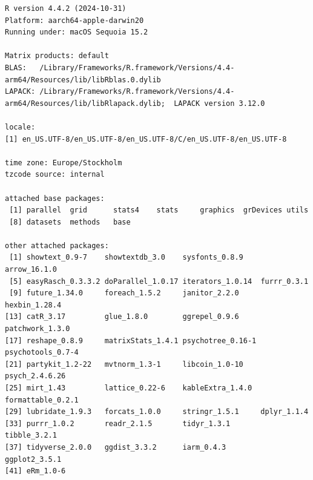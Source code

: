 \documentclass[
  letterpaper,
  DIV=11,
  numbers=noendperiod]{scrartcl}
\begin{document}
\begin{verbatim}
R version 4.4.2 (2024-10-31)
Platform: aarch64-apple-darwin20
Running under: macOS Sequoia 15.2

Matrix products: default
BLAS:   /Library/Frameworks/R.framework/Versions/4.4-arm64/Resources/lib/libRblas.0.dylib 
LAPACK: /Library/Frameworks/R.framework/Versions/4.4-arm64/Resources/lib/libRlapack.dylib;  LAPACK version 3.12.0

locale:
[1] en_US.UTF-8/en_US.UTF-8/en_US.UTF-8/C/en_US.UTF-8/en_US.UTF-8

time zone: Europe/Stockholm
tzcode source: internal

attached base packages:
 [1] parallel  grid      stats4    stats     graphics  grDevices utils    
 [8] datasets  methods   base     

other attached packages:
 [1] showtext_0.9-7    showtextdb_3.0    sysfonts_0.8.9    arrow_16.1.0     
 [5] easyRasch_0.3.3.2 doParallel_1.0.17 iterators_1.0.14  furrr_0.3.1      
 [9] future_1.34.0     foreach_1.5.2     janitor_2.2.0     hexbin_1.28.4    
[13] catR_3.17         glue_1.8.0        ggrepel_0.9.6     patchwork_1.3.0  
[17] reshape_0.8.9     matrixStats_1.4.1 psychotree_0.16-1 psychotools_0.7-4
[21] partykit_1.2-22   mvtnorm_1.3-1     libcoin_1.0-10    psych_2.4.6.26   
[25] mirt_1.43         lattice_0.22-6    kableExtra_1.4.0  formattable_0.2.1
[29] lubridate_1.9.3   forcats_1.0.0     stringr_1.5.1     dplyr_1.1.4      
[33] purrr_1.0.2       readr_2.1.5       tidyr_1.3.1       tibble_3.2.1     
[37] tidyverse_2.0.0   ggdist_3.3.2      iarm_0.4.3        ggplot2_3.5.1    
[41] eRm_1.0-6        


\end{verbatim}
\end{document}
